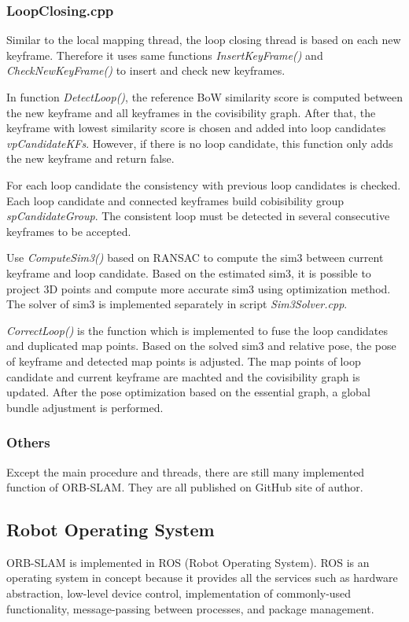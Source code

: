 \documentclass[letterpaper, 10 pt, conference]{ieeeconf}  %
\begin{document}
\subsubsection{LoopClosing.cpp}
Similar to the local mapping thread, the loop closing thread is based on each new keyframe. Therefore it uses same functions \textit{InsertKeyFrame()} and \textit{CheckNewKeyFrame()} to insert and check new keyframes.

In function \textit{DetectLoop()}, the reference BoW similarity score is computed between the new keyframe and all keyframes in the covisibility graph. After that, the keyframe with lowest similarity score is chosen and added into loop candidates \textit{vpCandidateKFs}. However, if there is no loop candidate, this function only adds the new keyframe and return false.

For each loop candidate the consistency with previous loop candidates is checked. Each loop candidate and connected keyframes build cobisibility group \textit{spCandidateGroup}. The consistent loop must be detected in several consecutive keyframes to be accepted.

Use \textit{ComputeSim3()} based on RANSAC to compute the sim3 between current keyframe and loop candidate. Based on the estimated sim3, it is possible to project 3D points and compute more accurate sim3 using optimization method. The solver of sim3 is implemented separately in script \textit{Sim3Solver.cpp}. 

\textit{CorrectLoop()} is the function which is implemented to fuse the loop candidates and duplicated map points. Based on the solved sim3 and relative pose, the pose of keyframe and detected map points is adjusted. The map points of loop candidate and current keyframe are machted and the covisibility graph is updated. After the pose optimization based on the essential graph, a global bundle adjustment is performed.

\subsubsection{Others}

Except the main procedure and threads, there are still many implemented function of ORB-SLAM. They are all published on GitHub site of author.

\subsection{Robot Operating System}
ORB-SLAM is implemented in ROS (Robot Operating System). ROS is an operating system in concept because it provides all the services such as hardware abstraction, low-level device control, implementation of commonly-used functionality, message-passing between processes, and package management.
\end{document}
